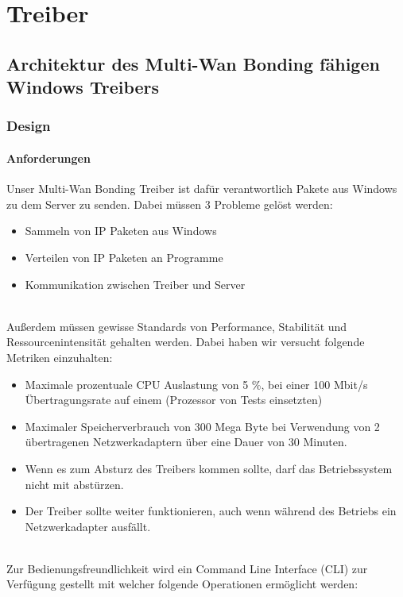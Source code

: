 \chapter{Treiber}
\label{chap:Treiber}

\section{Architektur des Multi-Wan Bonding fähigen Windows Treibers}
\subsection{Design}
\subsubsection{Anforderungen}
Unser Multi-Wan Bonding Treiber ist dafür verantwortlich Pakete aus Windows zu dem Server zu senden. Dabei müssen 3 Probleme gelöst werden:
\newline
\begin{itemize}
    \item Sammeln von IP Paketen aus Windows
    \item Verteilen von IP Paketen an Programme
    \item Kommunikation zwischen Treiber und Server
\end{itemize}
\ \\
Außerdem müssen gewisse Standards von Performance, Stabilität und Ressourcenintensität gehalten werden. Dabei haben wir versucht folgende Metriken einzuhalten:
\newline
\begin{itemize}
    \item Maximale prozentuale CPU Auslastung von 5 \%, bei einer 100 Mbit/s Übertragungsrate auf einem (Prozessor von Tests einsetzten)
    \item Maximaler Speicherverbrauch von 300 Mega Byte bei Verwendung von 2 übertragenen Netzwerkadaptern über eine Dauer von 30 Minuten.
    \item Wenn es zum Absturz des Treibers kommen sollte, darf das Betriebssystem nicht mit abstürzen.
    \item Der Treiber sollte weiter funktionieren, auch wenn während des Betriebs ein Netzwerkadapter ausfällt.
\end{itemize}
\ \\
Zur Bedienungsfreundlichkeit wird ein Command Line Interface (CLI)  zur Verfügung gestellt mit welcher folgende Operationen ermöglicht werden:
